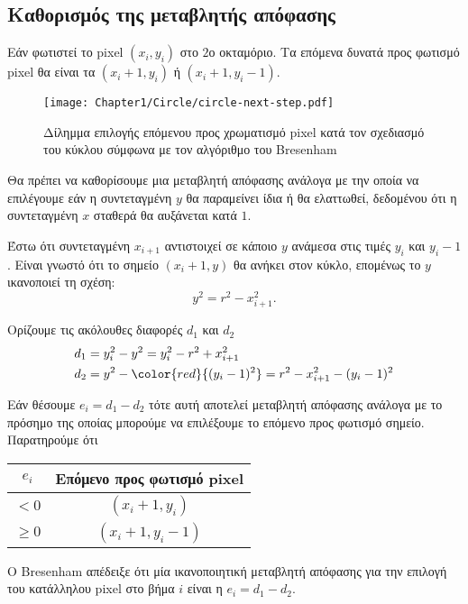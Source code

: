 \subsection{Καθορισμός της μεταβλητής απόφασης}


Εάν φωτιστεί το pixel $(x_i, y_i)$ στο $2$ο οκταμόριο. Τα επόμενα δυνατά προς φωτισμό pixel θα είναι τα $(x_i + 1, y_i)$ ή $(x_i + 1, y_i - 1)$. 

\begin{figure}[hbt]
  \begin{center}
	\texttt{[image: Chapter1/Circle/circle-next-step.pdf]}
  \end{center}
  \caption{Δίλημμα επιλογής επόμενου προς χρωματισμό pixel κατά τον σχεδιασμό του κύκλου σύμφωνα με τον αλγόριθμο του Bresenham}
\end{figure}

Θα πρέπει να καθορίσουμε μια μεταβλητή απόφασης ανάλογα με την οποία να επιλέγουμε εάν η συντεταγμένη $y$ θα παραμείνει ίδια ή θα ελαττωθεί, δεδομένου ότι η συντεταγμένη $x$ σταθερά θα αυξάνεται κατά $1$. 

Έστω ότι συντεταγμένη $x_{i+1}$ αντιστοιχεί σε κάποιο $y$ ανάμεσα στις τιμές $y_i$ και $y_i-1$. Είναι γνωστό ότι το σημείο $(x_i +1, y)$ θα ανήκει στον κύκλο, επομένως  το $y$ ικανοποιεί τη σχέση:
\[
	y^2 = r^2 - x_{i+1}^2.
\]

Ορίζουμε τις ακόλουθες διαφορές $d_1$ και $d_2$
\begin{align*}
	d_1 &= y_i^2 - y^2 = y_i^2 - r^2 + x_{i+1}^2 \\
	d_2 &= y^2 - \color{red}{(y_i-1)^2} = r^2 - x_{i+1}^2 - (y_i - 1)^2
\end{align*}

Εάν θέσουμε $e_i = d_1 - d_2$ τότε αυτή αποτελεί μεταβλητή απόφασης ανάλογα με το πρόσημο της οποίας μπορούμε να επιλέξουμε το επόμενο προς φωτισμό σημείο. Παρατηρούμε ότι


\begin{table}[htb]
\centering
	\begin{tabular}{@{}c|c@{}}
    \toprule
    $e_i$   & Επόμενο προς φωτισμό pixel \\ \midrule
    $<0$    & $(x_i + 1, y_i)$           \\
    $\geq 0$ & $(x_i + 1, y_i - 1)$      \\ \bottomrule
    \end{tabular}
\end{table}

Ο Bresenham απέδειξε ότι μία ικανοποιητική μεταβλητή απόφασης για την επιλογή του κατάλληλου pixel στο βήμα $i$ είναι η $e_i = d_1 - d_2$.


